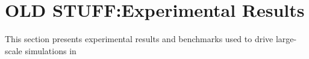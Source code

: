 \section{OLD STUFF:Experimental Results}

\label{sec:old-eval}



This section presents experimental results and benchmarks used to drive large-scale simulations in 






